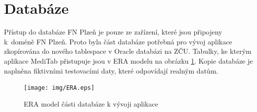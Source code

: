 \section{Databáze}

Přístup do databáze FN Plzeň je pouze ze zařízení, které jsou připojeny k~doméně FN Plzeň. Proto byla část databáze potřebná pro vývoj aplikace zkopírována do nového tablespace v Oracle databázi na ZČU. Tabulky, ke kterým aplikace MediTab přistupuje jsou v ERA modelu na obrázku \ref{fig:era}. Kopie databáze je naplněna fiktivními testovacími daty, které odpovídají realným datům.

\begin{figure}[H]
	\centering
	\texttt{[image: img/ERA.eps]}
	\caption{ERA model části databáze k vývoji aplikace}
  \label{fig:era}
\end{figure}
